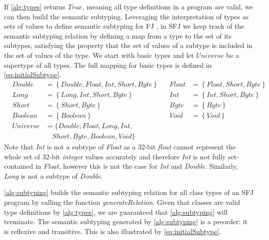 \documentclass[runningheads]{llncs}
\begin{document}
If \autoref{alg:types} returns $True$, meaning all type definitions in a program are valid, we can then build the semantic subtyping.
Leveraging the interpretation of types as sets of values to define semantic subtyping for FJ \cite{Dardha2013,Dardha2017}, in SFJ we keep track of the semantic subtyping relation by defining a map from a type to the set of its subtypes, satisfying the property that the set of values of a subtype is included in the set of values of the type.
We start with basic types and let $Universe$ be a supertype of all types.
The full mapping for basic types is defined in \autoref{eq:initialSubtype}.
\begin{equation}
    \label{eq:initialSubtype}
    \begin{array}{llllll}
        & Double   & = \left\{Double, Float, Int, Short, Byte\right\} &  & Float & = \left\{Float, Short, Byte\right\} \\
        & Long     & =    \left\{Long, Int, Short, Byte\right\}       &  & Int   & = \left\{Int, Short, Byte\right\}   \\
        & Short    & =    \left\{Short, Byte\right\}                  &  & Byte  & = \left\{Byte\right\}               \\
        & Boolean  & =    \left\{Boolean\right\}                      &  & Void  & = \left\{Void\right\}               \\
        & Universe & = \{Double, Float, Long, Int,                                                                     \\
        &          & \quad Short, Byte, Boolean, Void\}
   \end{array}
\end{equation}
Note that \emph{Int} is not a subtype of \emph{Float} as a 32-bit \emph{float} cannot represent the whole set of 32-bit \emph{integer} values accurately and therefore \emph{Int} is not fully set-contained in \emph{Float}, however this is not the case for \emph{Int} and \emph{Double}.
Similarly, \emph{Long} is not a subtype of \emph{Double}.

\autoref{alg:subtyping} builds the semantic subtyping relation for all class types of an SFJ program by calling the function \textit{generateRelation}.
Given that classes are valid type definitions by \autoref{alg:types}, we are guaranteed that \autoref{alg:subtyping} will terminate.
The semantic subtyping generated by \autoref{alg:subtyping} is a preorder: it is reflexive and transitive. This is also illustrated by \autoref{eq:initialSubtype}.
\end{document}
